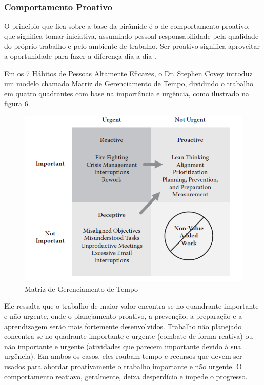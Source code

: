 \subsubsection[Comportamento Proativo]{Comportamento Proativo}

O princípio que fica sobre a base da pirâmide é o de comportamento proativo, que significa tomar iniciativa, assumindo pessoal responsabilidade pela qualidade do próprio trabalho e pelo ambiente de trabalho. Ser proativo significa aproveitar a oportunidade para fazer a diferença dia a dia \cite{bell2011}.

Em os 7 Hábitos de Pessoas Altamente Eficazes, o Dr. Stephen Covey introduz um modelo chamado Matriz de Gerenciamento de Tempo, dividindo o trabalho em quatro quadrantes com base na importância e urgência, como ilustrado na figura 6.

\begin{figure}[h]
		\centering
		\label{fig03}
			\includegraphics[scale=0.9]{figuras/matrizcomportamento.png}
		\caption{Matriz de Gerenciamento de Tempo \cite{bell2011}}
\end{figure}

Ele ressalta que o trabalho de maior valor encontra-se no quandrante importante e não urgente, onde o planejamento proativo, a prevenção, a preparação e a aprendizagem serão mais fortemente desenvolvidos. Trabalho não planejado concentra-se no quadrante importante e urgente (combate de forma reativa) ou não importante e urgente (atividades que parecem importante devido à sua urgência). Em ambos os casos, eles roubam tempo e recursos que devem ser usados para abordar proativamente o trabalho importante e não urgente. O comportamento reatiavo, geralmente, deixa desperdício e impede o progresso. 

